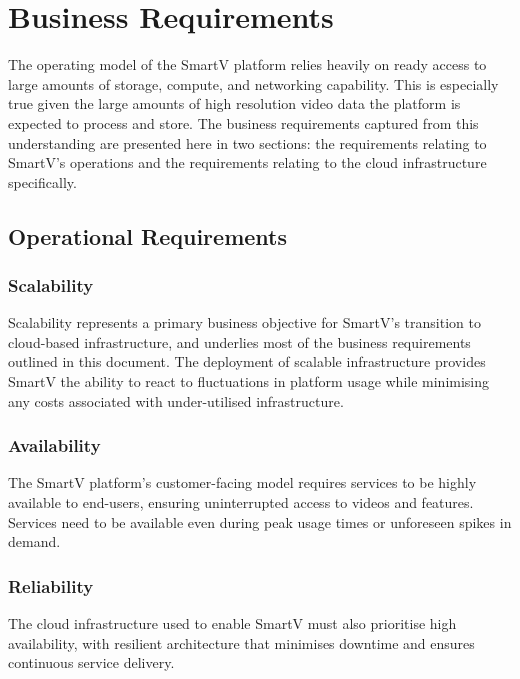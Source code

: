 \section{Business Requirements}

The operating model of the SmartV platform relies heavily on ready access to large amounts of storage, compute, and networking capability. This is especially true given the large amounts of high resolution video data the platform is expected to process and store. The business requirements captured from this understanding are presented here in two sections: the requirements relating to SmartV's operations and the requirements relating to the cloud infrastructure specifically.

\subsection{Operational Requirements}

\subsubsection{Scalability}

Scalability represents a primary business objective for SmartV's transition to cloud-based infrastructure, and underlies most of the business requirements outlined in this document. The deployment of scalable infrastructure provides SmartV the ability to react to fluctuations in platform usage while minimising any costs associated with under-utilised infrastructure.

\subsubsection{Availability}

The SmartV platform's customer-facing model requires services to be highly available to end-users, ensuring uninterrupted access to videos and features. Services need to be available even during peak usage times or unforeseen spikes in demand.


\subsubsection{Reliability}

The cloud infrastructure used to enable SmartV must also prioritise high availability, with resilient architecture that minimises downtime and ensures continuous service delivery. 

